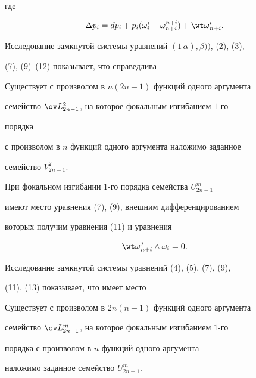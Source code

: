 где 


$$ 


\Delta p_i=d p_i+p_i(\omega^i_i-\omega^{n+i}_{n+i}) 


+\wt\omega{}^i_{n+i}. 


$$ 


Исследование замкнутой системы уравнений $(1\,\alpha), \beta))$, (2), (3),


(7), (9)--(12) показывает, что справедлива 


 


\begin{thm} 


Существует с произволом в $n(2n-1)$ функций одного аргумента 


семейство $\ov L{}^2_{2n-1}$, на которое фокальным изгибанием $1$-го 


порядка 


с произволом в $n$ функций одного аргумента наложимо заданное 


семейство $V^2_{2n-1}$. 


\end{thm} 


 


При фокальном изгибании 1-го порядка семейства $U^m_{2n-1}$ 


имеют место уравнения (7), (9), внешним дифференцированием 


которых получим уравнения (11) и уравнения 


\begin{equation} 


\wt\omega{}^j_{n+i}\wedge\omega_i=0. 


\end{equation} 


 


Исследование замкнутой системы уравнений (4), (5), (7), (9), 


(11), (13) показывает, что имеет место 


 


\begin{thm} 


Существует с произволом в $2n(n-1)$ функций одного аргумента 


семейство $\ov L{}^m_{2n-1}$, на которое фокальным изгибанием $1$-го 


порядка с произволом в $n$ функций одного аргумента 


наложимо заданное семейство $U^m_{2n-1}$. 


\end{thm} 


